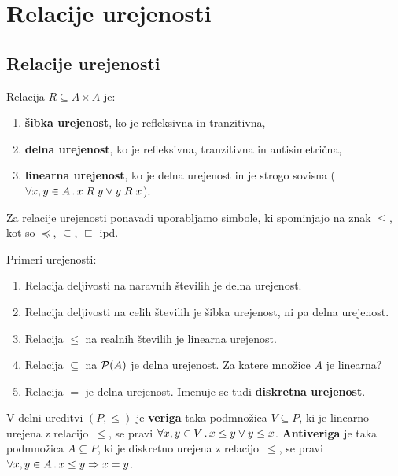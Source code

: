 \chapter{Relacije urejenosti}

\section{Relacije urejenosti}
\begin{definicija}
  Relacija $R \subseteq A \times A$ je:
  \begin{enumerate}
  \item \textbf{šibka urejenost}, ko je refleksivna in tranzitivna,
  \item \textbf{delna urejenost}, ko je refleksivna, tranzitivna in antisimetrična,
  \item \textbf{linearna urejenost}, ko je delna urejenost in je strogo sovisna ($\forall x, y \in A \,.\, x \mathrel{R} y \lor y \mathrel{R} x$).
  \end{enumerate}
\end{definicija}

Za relacije urejenosti ponavadi uporabljamo simbole, ki spominjajo na znak $\leq$, kot so $\preceq$, $\subseteq$, $\sqsubseteq$ ipd.

\begin{primer}
  Primeri urejenosti:
  \begin{enumerate}
    \item Relacija deljivosti na naravnih številih je delna urejenost.
    \item Relacija deljivosti na celih številih je šibka urejenost, ni pa delna urejenost.
    \item Relacija $\leq$ na realnih številih je linearna urejenost.
    \item Relacija $\subseteq$ na $\mathcal{P}(A)$ je delna urejenost. Za katere množice $A$ je linearna?
    \item Relacija $=$ je delna urejenost. Imenuje se tudi \textbf{diskretna urejenost}.
  \end{enumerate}
\end{primer}


\begin{definicija}
  V delni ureditvi $(P, {\leq})$ je \textbf{veriga} taka podmnožica $V \subseteq P$, ki je linearno urejena z relacijo~$\leq$, se pravi $\forall x, y \in V \,.\, x \leq y \lor y \leq x$. \textbf{Antiveriga} je taka podmnožica $A \subseteq P$, ki je diskretno urejena z relacijo~$\leq$, se pravi $\forall x, y \in A \,.\, x \leq y \Rightarrow x = y$.
\end{definicija}


